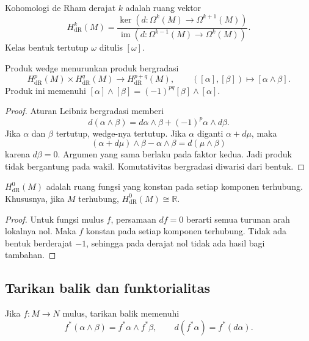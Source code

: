 \begin{definition}\label{o011-br-def-cohomology}
Kohomologi de Rham derajat $k$ adalah ruang vektor
\[
  H^k_{\mathrm{dR}}(M)
  =\frac{\ker(d\colon\Omega^k(M)\to\Omega^{k+1}(M))}
  {\operatorname{im}(d\colon\Omega^{k-1}(M)\to\Omega^k(M))}.
\]
Kelas bentuk tertutup $\omega$ ditulis $[\omega]$.
\end{definition}

\begin{Proposition}\label{o011-br-prop-wedge-ring}
Produk wedge menurunkan produk bergradasi
\[
 H^p_{\mathrm{dR}}(M)\times H^q_{\mathrm{dR}}(M)
 \longrightarrow H^{p+q}_{\mathrm{dR}}(M),
 \qquad ([\alpha],[\beta])\longmapsto[\alpha\wedge\beta].
\]
Produk ini memenuhi
$[\alpha]\wedge[\beta]=(-1)^{pq}[\beta]\wedge[\alpha]$.
\end{Proposition}

\begin{proof}
Aturan Leibniz bergradasi memberi
\[
 d(\alpha\wedge\beta)=d\alpha\wedge\beta
 +(-1)^p\alpha\wedge d\beta.
\]
Jika $\alpha$ dan $\beta$ tertutup, wedge-nya tertutup. Jika
$\alpha$ diganti $\alpha+d\mu$, maka
\[
 (\alpha+d\mu)\wedge\beta-\alpha\wedge\beta
 =d(\mu\wedge\beta)
\]
karena $d\beta=0$. Argumen yang sama berlaku pada faktor kedua. Jadi produk
tidak bergantung pada wakil. Komutativitas bergradasi diwarisi dari bentuk.
\end{proof}

\begin{Proposition}\label{o011-br-prop-h0-components}
$H^0_{\mathrm{dR}}(M)$ adalah ruang fungsi yang konstan pada setiap komponen
terhubung. Khususnya, jika $M$ terhubung, $H^0_{\mathrm{dR}}(M)\cong\mathbb R$.
\end{Proposition}

\begin{proof}
Untuk fungsi mulus $f$, persamaan $df=0$ berarti semua turunan arah lokalnya
nol. Maka $f$ konstan pada setiap komponen terhubung. Tidak ada bentuk
berderajat $-1$, sehingga pada derajat nol tidak ada hasil bagi tambahan.
\end{proof}

\subsection{Tarikan balik dan funktorialitas}

Jika $f\colon M\to N$ mulus, tarikan balik memenuhi
\[
 f^*(\alpha\wedge\beta)=f^*\alpha\wedge f^*\beta,
 \qquad d(f^*\alpha)=f^*(d\alpha).
\]

